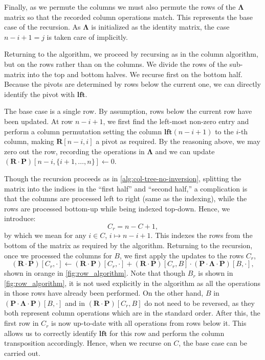 \documentclass{article}
\newtheorem{remark}[theorem]{Remark}
\newcommand{\mat}[1]{\mathbf{#1}}
\newcommand{\lft}{\mathbf{lft}}
\newcommand{\Remark}[1]{\textcolor{blue}{[#1]}}
\begin{document}


Finally, as we permute the columns we must also permute the rows of the $\mat{\Lambda}$  matrix so that the recorded column operations match. This represents the base case of the recursion.   As $\mat{\Lambda}$ is initialized as the identity matrix,  the case $n-i+1=j$ is taken care of implicitly.


Returning to the algorithm, we proceed by recursing as in the  column algorithm, but on the rows rather than on the columns. We divide the rows of the sub-matrix into the top and bottom halves. We recurse first on the bottom half. Because the pivots are determined by rows below the current one, we can directly identify the pivot with $\lft $. 

The base case is a single row. By assumption, rows below the current row have been updated. At row $n-i+1$, we first find the left-most non-zero entry and perform a column permutation setting the column $\lft (n-i+1)$ to the $i$-th column, making $\mat{R}[n-i,i]$ a pivot as required. By the reasoning above, we may zero out the row, recording the operations in $\mat{\Lambda}$ and we can update $(\mat{R} \cdot \mat{P})[n-i,\{i+1, \ldots,n\}] \gets 0$.




Though the recursion proceeds as in \cref{alg:col-tree-no-inversion}, splitting the matrix into the indices in the ``first half'' and ``second half,'' a complication is that the columns are processed left to right (same as the indexing), while the rows are processed bottom-up while being indexed top-down. Hence, we introduce:
\[C_r = n-C+1,\]
by which we mean for any $i\in C$, $i \mapsto n-i+1$. This indexes the rows from the bottom of the matrix as required by the algorithm. %
Returning to the recursion, once we processed the columns for $B$, 
%
we first apply the updates to the rows $C_r$, 
\[
    (\mat{R} \cdot \mat{P})[C_r,\cdot ] \gets (\mat{R} \cdot \mat{P})[C_r, \cdot ]
    +  (\mat{R} \cdot \mat{P})[C_r,B] \cdot (\mat{P} \cdot \mat{\Lambda} \cdot \mat{P})[B,\cdot],
\]
shown in orange in \cref{fig:row_algorithm}. Note that though $B_r$ is shown in \cref{fig:row_algorithm}, it is not used explicitly in the algorithm as all the operations in those rows have already been performed. On the other hand, $B$ in $(\mat{P} \cdot \mat{\Lambda} \cdot \mat{P})[B,\cdot]$ and in $(\mat{R} \cdot \mat{P})[C_r,B]$ do not need to be reversed, as they both represent column operations which are in the standard order.  After this, the first row in $C_r$ is now up-to-date with all operations from rows below it. This allows us to  correctly identify $\lft $ for this row and  perform the column transposition accordingly. Hence, when we recurse on $C$, the base case can be carried out. 
\end{document}
